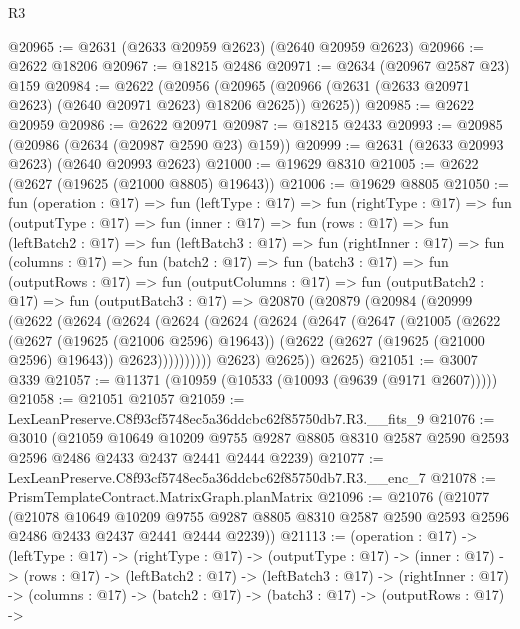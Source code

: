 \begin{lexlean}{R3}
\begin{coremodule}
@20965 := @2631 (@2633 @20959 @2623) (@2640 @20959 @2623)
@20966 := @2622 @18206
@20967 := @18215 @2486
@20971 := @2634 (@20967 @2587 @23) @159
@20984 := @2622
    (@20956 (@20965 (@20966 (@2631 (@2633 @20971 @2623) (@2640 @20971 @2623) @18206 @2625)) @2625))
@20985 := @2622 @20959
@20986 := @2622 @20971
@20987 := @18215 @2433
@20993 := @20985 (@20986 (@2634 (@20987 @2590 @23) @159))
@20999 := @2631 (@2633 @20993 @2623) (@2640 @20993 @2623)
@21000 := @19629 @8310
@21005 := @2622 (@2627 (@19625 (@21000 @8805) @19643))
@21006 := @19629 @8805
@21050 := fun (operation : @17) =>
  fun (leftType : @17) =>
  fun (rightType : @17) =>
  fun (outputType : @17) =>
  fun (inner : @17) =>
  fun (rows : @17) =>
  fun (leftBatch2 : @17) =>
  fun (leftBatch3 : @17) =>
  fun (rightInner : @17) =>
  fun (columns : @17) =>
  fun (batch2 : @17) =>
  fun (batch3 : @17) =>
  fun (outputRows : @17) =>
  fun (outputColumns : @17) =>
  fun (outputBatch2 : @17) =>
  fun (outputBatch3 : @17) =>
  @20870
    (@20879
      (@20984
        (@20999
          (@2622
            (@2624
              (@2624
                (@2624
                  (@2624
                    (@2624
                      (@2647
                        (@2647
                          (@21005
                            (@2622
                              (@2627 (@19625 (@21006 @2596) @19643))
                              (@2622 (@2627 (@19625 (@21000 @2596) @19643)) @2623))))))))))
            @2623)
          @2625))
      @2625)
@21051 := @3007 @339
@21057 := @11371 (@10959 (@10533 (@10093 (@9639 (@9171 @2607)))))
@21058 := @21051 @21057
@21059 := LexLeanPreserve.C8f93cf5748ec5a36ddcbc62f85750db7.R3.__fits_9
@21076 := @3010
    (@21059
      @10649
      @10209
      @9755
      @9287
      @8805
      @8310
      @2587
      @2590
      @2593
      @2596
      @2486
      @2433
      @2437
      @2441
      @2444
      @2239)
@21077 := LexLeanPreserve.C8f93cf5748ec5a36ddcbc62f85750db7.R3.__enc_7
@21078 := PrismTemplateContract.MatrixGraph.planMatrix
@21096 := @21076
    (@21077
      (@21078
        @10649
        @10209
        @9755
        @9287
        @8805
        @8310
        @2587
        @2590
        @2593
        @2596
        @2486
        @2433
        @2437
        @2441
        @2444
        @2239))
@21113 := (operation : @17) ->
  (leftType : @17) ->
  (rightType : @17) ->
  (outputType : @17) ->
  (inner : @17) ->
  (rows : @17) ->
  (leftBatch2 : @17) ->
  (leftBatch3 : @17) ->
  (rightInner : @17) ->
  (columns : @17) ->
  (batch2 : @17) ->
  (batch3 : @17) ->
  (outputRows : @17) ->

\end{coremodule}
\end{lexlean}
